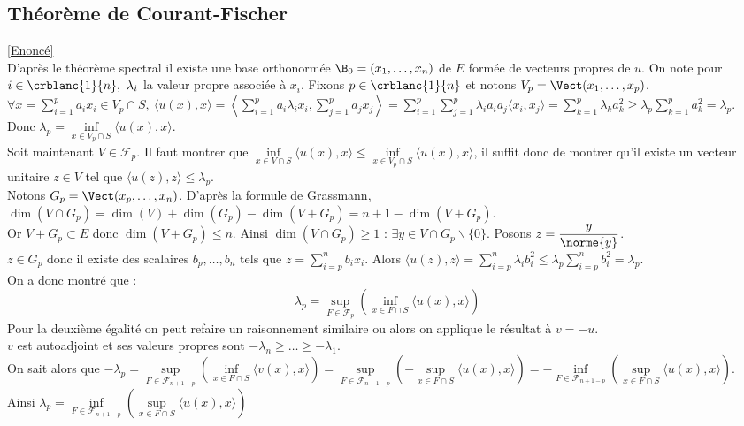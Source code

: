 \documentclass[8pt]{book}
\begin{document}
	\subsection{Théorème de Courant-Fischer }
	\label{Théorème de Courant-Fischer corrigé}
	\textcolor{blue}{\hyperref[Théorème de Courant-Fischer]{[Enoncé]}}\\
	D'après le théorème spectral il existe une base orthonormée $\B_0=(x_1,\dots,x_n)$ de $E$ formée de vecteurs propres de $u$. On note pour $i\in \crblanc{1}{n},\ \lambda_i$ la valeur propre associée à $x_i$. Fixons $p\in \crblanc{1}{n}$ et notons $V_p=\Vect(x_1,\dots,x_p)$.\\
	$\forall x=\displaystyle\sum_{i=1}^pa_ix_i\in V_p\cap S,\ \langle u(x),x\rangle=\left\langle\sum_{i=1}^pa_i\lambda_ix_i,\sum_{j=1}^pa_jx_j\right\rangle=\sum_{i=1}^p\sum_{j=1}^p\lambda_ia_ia_j\langle x_i,x_j\rangle=\sum_{k=1}^p\lambda_ka_k^2\geq \lambda_p\sum_{k=1}^pa_k^2=\lambda_p$.\\
	Donc $\lambda_p=\inf\limits_{x\in V_p\cap S}\langle u(x),x\rangle$.\\
	Soit maintenant $V\in \mathcal F_p$. Il faut montrer que $\inf\limits_{x\in V\cap S}\langle u(x),x\rangle\leq\inf\limits_{x\in V_p\cap S}\langle u(x),x\rangle$, il suffit donc de montrer qu'il existe un vecteur unitaire $z\in V$ tel que $\langle u(z),z\rangle\leq \lambda_p$.\\
	Notons $G_p=\Vect(x_p,\dots,x_n)$. D'après la formule de Grassmann,\\
	$\dim(V\cap G_p)=\dim(V)+\dim(G_p)-\dim(V+G_p)=n+1-\dim(V+G_p)$.\\
	Or $V+G_p\subset E$ donc $\dim(V+G_p)\leq n$. Ainsi $\dim(V\cap G_p)\geq 1$ : $\exists y\in V\cap G_p\backslash \{0\}$. Posons $z=\displaystyle\frac{y}{\norme{y}}$.\\
	$z\in G_p$ donc il existe des scalaires $b_p,\dots,b_n$ tels que $z=\displaystyle\sum_{i=p}^nb_ix_i$. Alors $\langle u(z),z\rangle=\displaystyle\sum_{i=p}^n\lambda_ib_i^2\leq \lambda_p\sum_{i=p}^nb_i^2=\lambda_p$.\\
	On a donc montré que :
	$$\lambda_p=\sup\limits_{F\in\mathcal F_p}\left(\inf\limits_{x\in F\cap S}\langle u(x),x\rangle\right)$$
	Pour la deuxième égalité on peut refaire un raisonnement similaire ou alors on applique le résultat à $v=-u$.\\
	$v$ est autoadjoint et ses valeurs propres sont $-\lambda_n\geq\dots\geq-\lambda_1$.\\
	On sait alors que $-\lambda_p=\sup\limits_{F\in\mathcal F_{n+1-p}}\left(\inf\limits_{x\in F\cap S}\langle v(x),x\rangle\right)=\sup\limits_{F\in\mathcal F_{n+1-p}}\left(-\sup\limits_{x\in F\cap S}\langle u(x),x\rangle\right)=-\inf\limits_{F\in\mathcal F_{n+1-p}}\left(\sup\limits_{x\in F\cap S}\langle u(x),x\rangle\right)$.\\
	Ainsi $\lambda_p=\inf\limits_{F\in\mathcal F_{n+1-p}}\left(\sup\limits_{x\in F\cap S}\langle u(x),x\rangle\right)$
	
\end{document}
